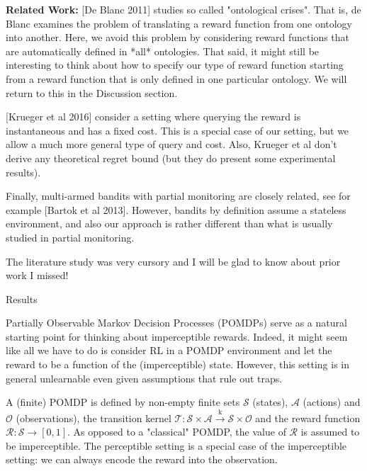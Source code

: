 \documentclass[a4paper]{article}
\newcommand{\Co}[1]{}
\newcommand{\San}[1]{}
\newcommand{\K}{\xrightarrow{\mathrm{k}}}
\newcommand{\St}{\mathcal{S}}
\newcommand{\A}{\mathcal{A}}
\newcommand{\Ob}{\mathcal{O}}
\newcommand{\R}{\mathcal{R}}
\newcommand{\T}{\mathcal{T}}
\begin{document}
\textbf{Related Work:}\Co{b} [De Blanc 2011]\San{(https://arxiv.org/abs/1105.3821)}\Co{s} studies so called "ontological crises". That is, de Blanc examines the problem of translating a reward function from one ontology into another. Here, we avoid this problem by considering reward functions that are automatically defined in *all* ontologies. That said, it might still be interesting to think about how to specify our type of reward function starting from a reward function that is only defined in one particular ontology. We will return to this in the Discussion section.

[Krueger et al 2016]\San{(https://pdfs.semanticscholar.org/a47f/52b25ce1e56a03876d9c0fd7c45e63270eb4.pdf)}\Co{s} consider a setting where querying the reward is instantaneous and has a fixed cost. This is a special case of our setting, but we allow a much more general type of query and cost. Also, Krueger et al don't derive any theoretical regret bound (but they do present some experimental results).

Finally, multi-armed bandits with partial monitoring are closely related, see for example [Bartok et al 2013]\San{(http://www.mit.edu/~rakhlin/papers/partial_monitoring.pdf)}\Co{s}. However, bandits by definition assume a stateless environment, and also our approach is rather different than what is usually studied in partial monitoring.

The literature study was very cursory and I will be glad to know about prior work I missed!

\begin{Huge}Results\end{Huge}

Partially Observable Markov Decision Processes (POMDPs) serve as a natural starting point for thinking about imperceptible rewards. Indeed, it might seem like all we have to do is consider RL in a POMDP environment and let the reward to be a function of the (imperceptible) state. However, this setting is in general unlearnable even given assumptions that rule out traps.

A (finite) POMDP is defined by non-empty finite sets $\St$ (states), $\A$ (actions) and $\Ob$ (observations), the transition kernel $\T:\St\times\A\K\St\times\Ob$ and the reward function $\R:\St\rightarrow[0,1]$. As opposed to a "classical" POMDP, the value of $\R$ is assumed to be imperceptible. The perceptible setting is a special case of the imperceptible setting: we can always encode the reward into the observation.
\end{document}
